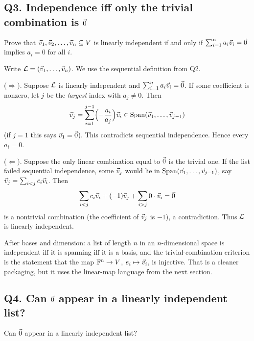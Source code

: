 \subsection{Q3. Independence iff only the trivial combination is $\vec{0}$}

\begin{promptbox}
Prove that $\vec{v}_1,\vec{v}_2,\ldots,\vec{v}_n\subseteq V$ is linearly independent if and
only if $\sum_{i=1}^n a_i\vec{v}_i=\vec{0}$ implies $a_i=0$ for all $i$.
\end{promptbox}

\begin{coursebox}
Write $\mathcal{L}=(\vec{v}_1,\ldots,\vec{v}_n)$. We use the sequential definition from Q2.

($\Rightarrow$).
Suppose $\mathcal{L}$ is linearly independent and $\sum_{i=1}^n a_i\vec{v}_i=\vec{0}$.
If some coefficient is nonzero, let $j$ be the \emph{largest} index with
$a_j\neq 0$. Then
\[
\vec{v}_j
=\sum_{i=1}^{j-1}\Bigl(-\frac{a_i}{a_j}\Bigr)\vec{v}_i
\in\operatorname{Span}(\vec{v}_1,\ldots,\vec{v}_{j-1})
\]
(if $j=1$ this says $\vec{v}_1=\vec{0}$). This contradicts sequential independence.
Hence every $a_i=0$.

($\Leftarrow$).
Suppose the only linear combination equal to $\vec{0}$ is the trivial one.
If the list failed sequential independence, some $\vec{v}_j$ would lie in
$\operatorname{Span}(\vec{v}_1,\ldots,\vec{v}_{j-1})$, say
$\vec{v}_j=\sum_{i<j}c_i\vec{v}_i$. Then
\[
\sum_{i<j}c_i\vec{v}_i + (-1)\vec{v}_j+\sum_{i>j}0\cdot\vec{v}_i=\vec{0}
\]
is a nontrivial combination (the coefficient of $\vec{v}_j$ is $-1$), a contradiction.
Thus $\mathcal{L}$ is linearly independent.
\end{coursebox}

\begin{laterbox}
After bases and dimension: a list of length $n$ in an $n$-dimensional space is
independent iff it is spanning iff it is a basis, and the trivial-combination
criterion is the statement that the map $\mathbb{F}^n\to V$,
$e_i\mapsto\vec{v}_i$, is injective. That is a cleaner packaging, but it uses the
linear-map language from the next section.
\end{laterbox}

\subsection{Q4. Can $\vec{0}$ appear in a linearly independent list?}

\begin{promptbox}
Can $\vec{0}$ appear in a linearly independent list?
\end{promptbox}


